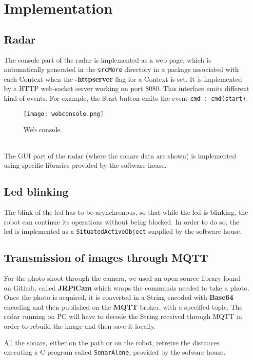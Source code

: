 \section{Implementation}
\subsection{Radar}
The console part of the radar is implemented as a web page, which is automatically generated in the \lstinline[columns=fixed]{srcMore} directory in a package associated with each Context when the \textbf{-httpserver} flag for a Context is set. It is implemented by a HTTP web-socket server working on port 8080. This interface emits different kind of events. For example, the Start button emits the event  \lstinline[columns=fixed]{cmd : cmd(start)}.
\begin{figure}[h]
	\centering
	\texttt{[image: webconsole.png]}
	\caption{Web console.}
\end{figure}
\\
The GUI part of the radar (where the sonars data are shown) is implemented using specific libraries provided by the software house.
\subsection{Led blinking}
The blink of the led has to be asynchronous, so that while the led is blinking, the robot can continue its operations without being blocked. In order to do so, the led is implemented as a \lstinline[columns=fixed]{SituatedActiveObject} supplied by the software house.

\subsection{Transmission of images through MQTT}
For the photo shoot through the camera, we used an open source library found on Github, called \textbf{JRPiCam} which wraps the commands needed to take a photo. Once the photo is acquired, it is converted in a String encoded with \textbf{Base64} encoding and then published on the \textbf{MQTT} broker, with a specified topic. The radar running on PC will have to decode the String received through MQTT in order to rebuild the image and then save it locally.


All the sonars, either on the path or on the robot, retreive the distances executing a C program called \lstinline[columns=fixed]{SonarAlone}, provided by the sofware house.
